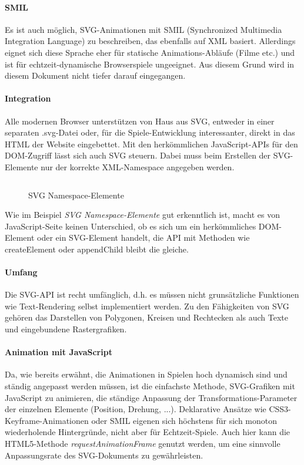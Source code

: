 \documentclass[a4paper, 12pt]{article}
\begin{document}
\paragraph{SMIL} Es ist auch möglich, SVG-Animationen mit SMIL (Synchronized Multimedia Integration Language) zu beschreiben, das ebenfalls auf XML basiert. Allerdings eignet sich diese Sprache eher für statische Animations-Abläufe (Filme etc.) und ist für echtzeit-dynamische Browserspiele ungeeignet. Aus diesem Grund wird in diesem Dokument nicht tiefer darauf eingegangen.\cite{SmilSpec}
\paragraph{Integration} Alle modernen Browser unterstützen von Haus aus SVG, entweder in einer separaten .svg-Datei oder, für die Spiele-Entwicklung interessanter, direkt in das HTML der Website eingebettet. Mit den herkömmlichen JavaScript-APIs für den DOM-Zugriff lässt sich auch SVG steuern. Dabei muss beim Erstellen der SVG-Elemente nur der korrekte XML-Namespace angegeben werden.
\begin{figure}[h!]
	\inputminted{javascript}{assets/svg_example.js}
	\caption{SVG Namespace-Elemente}
	\label{svg_namespace_example}
\end{figure}
Wie im Beispiel \emph{SVG Namespace-Elemente} gut erkenntlich ist, macht es von JavaScript-Seite keinen Unterschied, ob es sich um ein herkömmliches DOM-Element oder ein SVG-Element handelt, die API mit Methoden wie createElement oder appendChild bleibt die gleiche.
\paragraph{Umfang} Die SVG-API ist recht umfänglich, d.h. es müssen nicht grunsätzliche Funktionen wie Text-Rendering selbst implementiert werden. Zu den Fähigkeiten von SVG gehören das Darstellen von Polygonen, Kreisen und Rechtecken als auch Texte und eingebundene Rastergrafiken.\cite{SVGSpec}
\paragraph{Animation mit JavaScript} Da, wie bereits erwähnt, die Animationen in Spielen hoch dynamisch sind und ständig angepasst werden müssen, ist die einfachste Methode, SVG-Grafiken mit JavaScript zu animieren, die ständige Anpassung der Transformations-Parameter der einzelnen Elemente (Position, Drehung, ...). Deklarative Ansätze wie CSS3-Keyframe-Animationen oder SMIL eigenen sich höchstens für sich monoton wiederholende Hintergründe, nicht aber für Echtzeit-Spiele. Auch hier kann die HTML5-Methode \emph{requestAnimationFrame} genutzt werden, um eine sinnvolle Anpassungsrate des SVG-Dokuments zu gewährleisten.
\end{document}
